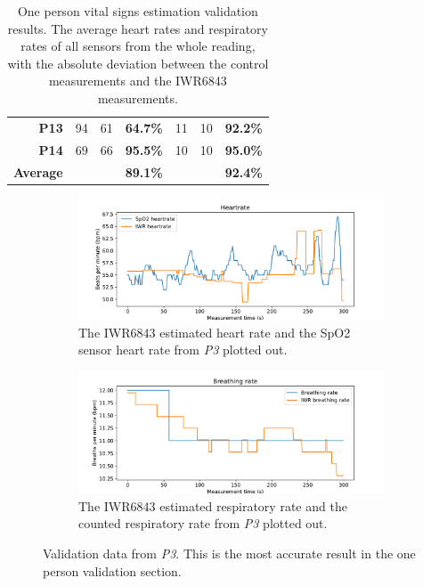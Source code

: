 \begin{table}[ht]
\begin{tabular}{|r|c|c|l|c|c|l|}
\textbf{P13} & 94 & 61 & \textbf{64.7\%} & 11 & 10 & \textbf{92.2\%} \\
\textbf{P14} & 69 & 66 & \textbf{95.5\%} & 10 & 10 & \textbf{95.0\%} \\ \hline
\textbf{Average} & \textbf{} & \textbf{} & \textbf{89.1\%} &  &  & \textbf{92.4\%} \\ \hline
\end{tabular}
\caption{One person vital signs estimation validation results. The average heart rates and respiratory rates of all sensors from the whole reading, with the absolute deviation between the control measurements and the IWR6843 measurements.}
\label{tab:one-person-results_2}
\end{table}

\begin{figure}[t]
\begin{subfigure}{\textwidth}
  \centering
  \includegraphics[width=\linewidth]{figures/validation/roy_heart.pdf}  
  \caption{The IWR6843 estimated heart rate and the SpO2 sensor heart rate from \emph{P3} plotted out.}
  \label{fig:roy_heart}
\end{subfigure}
\begin{subfigure}{\textwidth}
  \centering
  \includegraphics[width=\linewidth]{figures/validation/roy_breath.pdf}  
  \caption{The IWR6843 estimated respiratory rate and the counted respiratory rate from \emph{P3} plotted out.}
  \label{fig:roy_breath}
\end{subfigure}
\caption{Validation data from \emph{P3}. This is the most accurate result in the one person validation section.}
\label{fig:roy_meas}
\end{figure}

